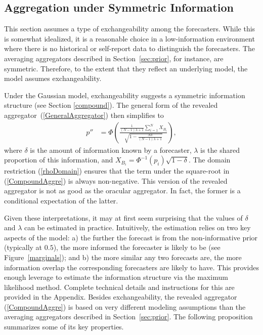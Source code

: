 \documentclass[11pt]{article}
\theoremstyle{definition}
\theoremstyle{definition}
\begin{document}
\subsection{Aggregation under Symmetric Information}
\label{compound2}
This section assumes a type of exchangeability among the forecasters.
While this is somewhat idealized, it is a reasonable choice in a
low-information environment where there is no historical or
self-report data to distinguish the forecasters.  The averaging
aggregators described in Section~\ref{sec:prior}, for instance, are
symmetric. Therefore, to the extent that they reflect an underlying
model, the model assumes exchangeability. 

Under the Gaussian model, exchangeability suggests a
symmetric information structure (see Section \ref{compound}). The
general form of the revealed aggregator~(\ref{GeneralAggregator}) then
simplifies to
\begin{align}
p''
  &=\Phi\left(\frac{\frac{1}{(N-1)\lambda +1} 
  \sum_{i=1}^N X_{B_i} }{\sqrt{1- \frac{N\delta}{(N-1)\lambda +1} }}  
  \right), \label{CompoundAggre}
\end{align}
where $\delta$ is the amount of information known by a forecaster, 
$\lambda$ is the shared proportion of this information, and $X_{B_i} =
\Phi^{-1}(p_i)\sqrt{1-\delta}$. 
The domain restriction (\ref{rhoDomain}) ensures that the term under
the square-root in (\ref{CompoundAggre}) is always non-negative. This version of the revealed aggregator is not as good as the oracular
aggregator. In fact, the former is a conditional expectation of the latter.

Given these interpretations, it may at first seem surprising that the
values of $\delta$ and $\lambda$ can be estimated in practice.
Intuitively, the estimation relies on two key aspects of the model: a)
the further the forecast is from the non-informative prior (typically
at $0.5$), the more informed the forecaster is likely to be (see
Figure~\ref{marginals}); and b) the more similar any two forecasts
are, the more information overlap the corresponding forecasters are
likely to have. This provides enough leverage to estimate the
information structure via the maximum likelihood method.  Complete
technical details and instructions for this are provided in the
Appendix.  Besides exchangeability, the revealed aggregator
(\ref{CompoundAggre}) is based on very different modeling assumptions
than the averaging aggregators described in
Section~\ref{sec:prior}. The following proposition summarizes some of
its key properties.
\end{document}
